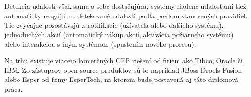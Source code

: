 	
	Detekcia udalostí však sama o sebe dostačujúca, systémy riadené udalosťami tiež automaticky reagujú na detekované udalosti podľa predom stanovených pravidiel. Tie zvyčajne pozostávajú z notifikácie (užívateľa alebo ďalšieho systému), jednoduchých akcií (automatický nákup akcií, aktivácia požiarneho systému) alebo interakciou s iným systémom (spustením nového procesu).

	Na trhu existuje viacero komerčných CEP riešení od firiem ako Tibco, Oracle či IBM. Zo zástupcov open-source produktov sú to napríklad JBoss Drools Fusion alebo Esper od firmy EsperTech, na ktorom bude postavená aj táto diplomová práca.


